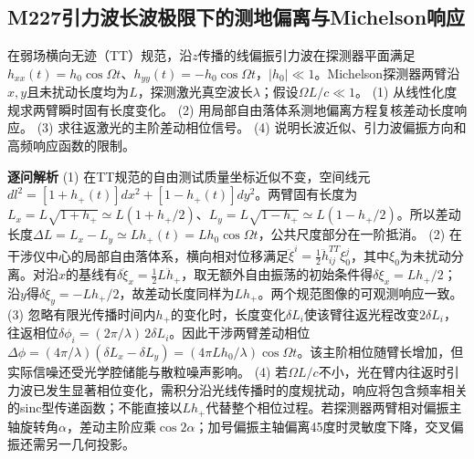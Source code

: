 \subsection*{M227\quad 引力波长波极限下的测地偏离与Michelson响应}
在弱场横向无迹（TT）规范，沿$z$传播的线偏振引力波在探测器平面满足$h_{xx}(t)=h_0\cos\Omega t$、$h_{yy}(t)=-h_0\cos\Omega t$，$|h_0|\ll1$。Michelson探测器两臂沿$x,y$且未扰动长度均为$L$，探测激光真空波长$\lambda$；假设$\Omega L/c\ll1$。
(1) 从线性化度规求两臂瞬时固有长度变化。
(2) 用局部自由落体系测地偏离方程复核差动长度响应。
(3) 求往返激光的主阶差动相位信号。
(4) 说明长波近似、引力波偏振方向和高频响应函数的限制。
\par\textbf{逐问解析}
(1) 在TT规范的自由测试质量坐标近似不变，空间线元$dl^2=[1+h_+(t)]dx^2+[1-h_+(t)]dy^2$。两臂固有长度为$L_x=L\sqrt{1+h_+}\simeq L(1+h_+/2)$、$L_y=L\sqrt{1-h_+}\simeq L(1-h_+/2)$。所以差动长度$\Delta L=L_x-L_y\simeq Lh_+(t)=Lh_0\cos\Omega t$，公共尺度部分在一阶抵消。
(2) 在干涉仪中心的局部自由落体系，横向相对位移满足$\ddot\xi^i=\frac12\ddot h_{ij}^{TT}\xi_0^j$，其中$\xi_0$为未扰动分离。对沿$x$的基线有$\ddot{\delta\xi_x}=\frac12L\ddot h_+$，取无额外自由振荡的初始条件得$\delta\xi_x=Lh_+/2$；沿$y$得$\delta\xi_y=-Lh_+/2$，故差动长度同样为$Lh_+$。两个规范图像的可观测响应一致。
(3) 忽略有限光传播时间内$h_+$的变化时，长度变化$\delta L_i$使该臂往返光程改变$2\delta L_i$，往返相位$\delta\phi_i=(2\pi/\lambda)\,2\delta L_i$。因此干涉两臂差动相位$\Delta\phi=(4\pi/\lambda)(\delta L_x-\delta L_y)=(4\pi Lh_0/\lambda)\cos\Omega t$。该主阶相位随臂长增加，但实际信噪还受光学腔储能与散粒噪声影响。
(4) 若$\Omega L/c$不小，光在臂内往返时引力波已发生显著相位变化，需积分沿光线传播时的度规扰动，响应将包含频率相关的sinc型传递函数；不能直接以$Lh_+$代替整个相位过程。若探测器两臂相对偏振主轴旋转角$\alpha$，差动主阶应乘$\cos2\alpha$；加号偏振主轴偏离45度时灵敏度下降，交叉偏振还需另一几何投影。
\par\medskip
